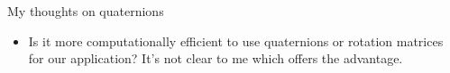 \documentclass{beamer}
\newcommand{\real}{\mathbf{R}}
\begin{document}
\begin{frame}{My thoughts on quaternions}
\begin{itemize}
\item Is it more computationally efficient to use quaternions or rotation matrices for our application? It's not clear to me which offers the advantage.
\end{itemize}
\end{frame}

%
%
\end{document}
